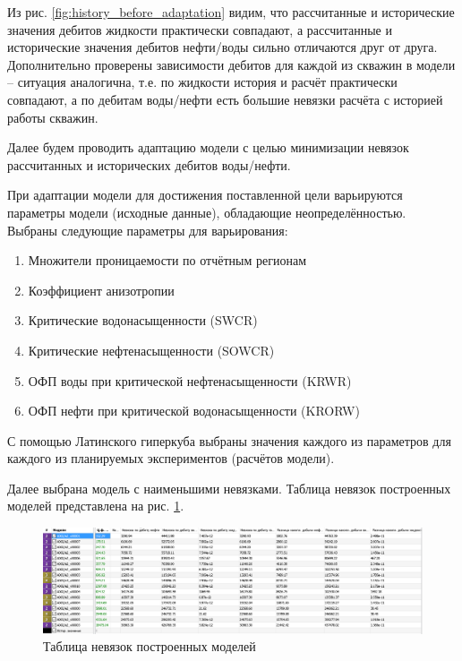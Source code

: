 \documentclass[a4paper,12pt]{article}
\begin{document}
Из рис. \ref{fig:history_before_adaptation} видим, что рассчитанные и исторические значения дебитов жидкости практически совпадают, а рассчитанные и исторические значения дебитов нефти/воды сильно отличаются друг от друга.
Дополнительно проверены зависимости дебитов для каждой из скважин в модели -- ситуация аналогична, т.е. по жидкости история и расчёт практически совпадают, а по дебитам воды/нефти есть большие невязки расчёта с историей работы скважин. 

Далее будем проводить адаптацию модели с целью минимизации невязок рассчитанных и исторических дебитов воды/нефти.

При адаптации модели для достижения поставленной цели варьируются параметры модели (исходные данные), обладающие неопределённостью.
\\
\newline
Выбраны следующие параметры для варьирования:
\begin{enumerate}[parsep=-5pt]
	\item Множители проницаемости по отчётным регионам
	\item Коэффициент анизотропии
	\item Критические водонасыщенности (SWCR)
	\item Критические нефтенасыщенности (SOWCR)
	\item ОФП воды при критической нефтенасыщенности (KRWR)
	\item ОФП нефти при критической водонасыщенности (KRORW)
\end{enumerate}

С помощью Латинского гиперкуба выбраны значения каждого из параметров для каждого из планируемых экспериментов (расчётов модели).

Далее выбрана модель с наименьшими невязками.
Таблица невязок построенных моделей представлена на рис. \ref{fig:nevyazky}.

\begin{figure}[H]
\center
\includegraphics[width=\textwidth]{nevyazky}
\caption{Таблица невязок построенных моделей}
\label{fig:nevyazky}
\end{figure}
\end{document}
